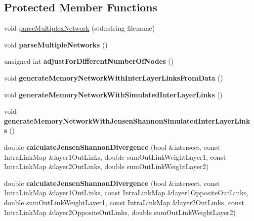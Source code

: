 \subsection*{Protected Member Functions}
\begin{DoxyCompactItemize}
\item 
void \mbox{\hyperlink{classMultiplexNetwork_adef6c48117bba4729ad4067ee886860d}{parse\+Multiplex\+Network}} (std\+::string filename)
\item 
\mbox{\label{classMultiplexNetwork_a18e0acfff14cdfe92d41a6ac3d1cc03f}} 
void {\bfseries parse\+Multiple\+Networks} ()
\item 
\mbox{\label{classMultiplexNetwork_ae1a15fc36aab7568d72d10e19ea853cd}} 
unsigned int {\bfseries adjust\+For\+Different\+Number\+Of\+Nodes} ()
\item 
\mbox{\label{classMultiplexNetwork_ab756c856e9ee64f2973ea78575796883}} 
void {\bfseries generate\+Memory\+Network\+With\+Inter\+Layer\+Links\+From\+Data} ()
\item 
\mbox{\label{classMultiplexNetwork_a4e9502b36ee1259f762526082fd03d73}} 
void {\bfseries generate\+Memory\+Network\+With\+Simulated\+Inter\+Layer\+Links} ()
\item 
\mbox{\label{classMultiplexNetwork_af1810bd3d428cf7c124bf9c2de951ac7}} 
void {\bfseries generate\+Memory\+Network\+With\+Jensen\+Shannon\+Simulated\+Inter\+Layer\+Links} ()
\item 
\mbox{\label{classMultiplexNetwork_ac338bc6dedb3af36d30cbcb71e9f62e4}} 
double {\bfseries calculate\+Jensen\+Shannon\+Divergence} (bool \&intersect, const Intra\+Link\+Map \&layer1\+Out\+Links, double sum\+Out\+Link\+Weight\+Layer1, const Intra\+Link\+Map \&layer2\+Out\+Links, double sum\+Out\+Link\+Weight\+Layer2)
\item 
\mbox{\label{classMultiplexNetwork_ae084ab5790f56609b6c408eb080e305b}} 
double {\bfseries calculate\+Jensen\+Shannon\+Divergence} (bool \&intersect, const Intra\+Link\+Map \&layer1\+Out\+Links, const Intra\+Link\+Map \&layer1\+Opposite\+Out\+Links, double sum\+Out\+Link\+Weight\+Layer1, const Intra\+Link\+Map \&layer2\+Out\+Links, const Intra\+Link\+Map \&layer2\+Opposite\+Out\+Links, double sum\+Out\+Link\+Weight\+Layer2)

\end{DoxyCompactItemize}

